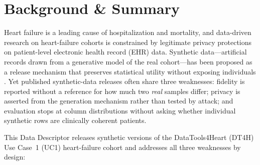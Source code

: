 \documentclass[11pt,a4paper]{article}
\begin{document}
\section{Background \& Summary}

Heart failure is a leading cause of hospitalization and mortality, and data-driven
research on heart-failure cohorts is constrained by legitimate privacy protections on
patient-level electronic health record (EHR) data. Synthetic data---artificial
records drawn from a generative model of the real cohort---has been proposed as a
release mechanism that preserves statistical utility without exposing individuals
\citep{chen2021synthetic, hernandez2022synthetic, gonzales2023synthetic}. Yet published synthetic-data
releases often share three weaknesses: fidelity is reported without a reference for
how much two \emph{real} samples differ; privacy is asserted from the generation
mechanism rather than tested by attack; and evaluation stops at column distributions
without asking whether individual synthetic rows are clinically coherent patients.

This Data Descriptor releases synthetic versions of the DataTools4Heart (DT4H) Use
Case~1 (UC1) heart-failure cohort and addresses all three weaknesses by design:
\end{document}
